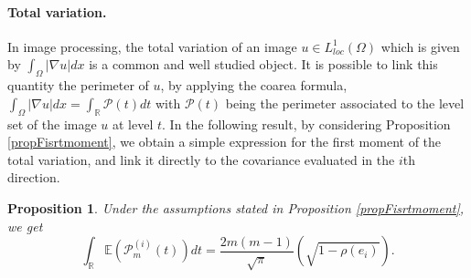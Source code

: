\documentclass[12pt]{article}
\theoremstyle{Theorem}
\newtheorem{Proposition}[Theorem]{Proposition}
\theoremstyle{definition}
\begin{document}
\paragraph{Total variation.}In image processing, the total variation of an image $u \in L^{1}_{loc}(\Omega)$ which is given by $\int_{\Omega}|\nabla u|dx$ is a common and well studied object. It is possible to link this quantity the perimeter of $u$, by applying the coarea formula, $\int_{\Omega}|\nabla u|dx = \int_{\mathbb{R}}\mathcal{P}(t)dt$ with $\mathcal{P}(t)$ being the perimeter associated to the level set of the image $u$ at level $t$. In the following result, by considering Proposition \eqref{propFisrtmoment}, we obtain a simple expression for the first moment of the total variation, and link it directly to the covariance evaluated in the $i$th direction.
\begin{Proposition}
\label{Variationtotal}
Under the assumptions stated in Proposition \ref{propFisrtmoment}, we get 
\begin{equation}
\label{totalvariation}
\int_{\mathbb{R}} \mathbb{E}\left(\mathcal{P}^{(i)}_{m}(t)\right) dt = \frac{2m(m-1)}{\sqrt{\pi}}\left(\sqrt{1-\rho(e_i)}  \right).
\end{equation}
\end{Proposition}
\end{document}
